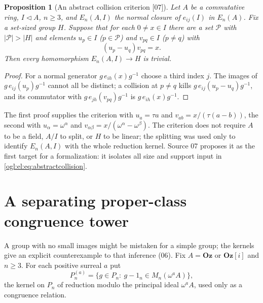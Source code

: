 \documentclass[11pt,oneside]{article}
\numberwithin{equation}{section}
\newtheorem{proposition}[proposition]{Proposition}
\theoremstyle{definition}
\theoremstyle{remark}
\newcommand{\Oz}{\mathbf{Oz}}
\newcommand{\GOz}{\mathbf{Oz}[i]}
\newcommand{\src}[1]{\textup{\textsf{\small[#1]}}}
\begin{document}
\begin{proposition}[An abstract collision criterion \src{07}]\label{ogl:el:prop:criterion}
Let $A$ be a commutative ring, $I\lhd A$, $n\ge3$, and $E_n(A,I)$ the normal
closure of $e_{ij}(I)$ in $E_n(A)$. Fix a set-sized group $H$. Suppose that for
each $0\ne x\in I$ there are a set $\mathcal P$ with $|\mathcal P|>|H|$ and
elements $u_p\in I$ ($p\in\mathcal P$) and $v_{pq}\in I$ ($p\ne q$) with
\begin{equation}\label{ogl:el:eq:abstractcollision}
 (u_p-u_q)v_{pq}=x .
\end{equation}
Then every homomorphism $E_n(A,I)\to H$ is trivial.
\end{proposition}
\begin{proof}
For a normal generator $g\,e_{ih}(x)g^{-1}$ choose a third index $j$. The images
of $g\,e_{ij}(u_p)g^{-1}$ cannot all be distinct; a collision at $p\ne q$
kills $g\,e_{ij}(u_p-u_q)g^{-1}$, and its commutator with
$g\,e_{jh}(v_{pq})g^{-1}$ is $g\,e_{ih}(x)g^{-1}$.
\end{proof}

The first proof supplies the criterion with $u_a=\tau a$ and
$v_{ab}=x/(\tau(a-b))$, the second with $u_\alpha=\omega^\alpha$ and
$v_{\alpha\beta}=x/(\omega^\alpha-\omega^\beta)$. The criterion does not require
$A$ to be a field, $A/I$ to split, or $H$ to be linear; the splitting was used
only to identify $E_n(A,I)$ with the whole reduction kernel. Source 07 proposes
it as the first target for a formalization: it isolates all size and support
input in \eqref{ogl:el:eq:abstractcollision}.

\section{A separating proper-class congruence tower}\label{ogl:el:sec:tower}

A group with no small images might be mistaken for a simple group; the kernels
give an explicit counterexample to that inference (06). Fix $A=\Oz$ or $\GOz$
and $n\ge3$. For each positive surreal $a$ put
\begin{equation}\label{ogl:el:eq:Pa}
 P_n^{(a)}=\{g\in P_n:\ g-1_n\in M_n(\omega^aA)\},
\end{equation}
the kernel on $P_n$ of reduction modulo the principal ideal $\omega^aA$, used
only as a congruence relation.
\end{document}
